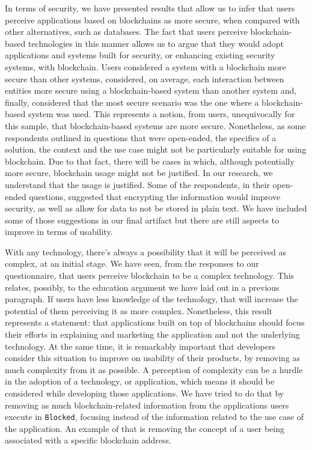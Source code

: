 In terms of security, we have presented results that allow us to infer that users perceive applications based on blockchains as more secure, when compared with other alternatives, such as databases. The fact that users perceive blockchain-based technologies in this manner allows us to argue that they would adopt applications and systems built for security, or enhancing existing security systems, with blockchain. Users considered a system with a blockchain more secure than other systems, considered, on average, each interaction between entities more secure using a blockchain-based system than another system and, finally, considered that the most secure scenario was the one where a blockchain-based system was used. This represents a notion, from users, unequivocally for this sample, that blockchain-based systems are more secure. Nonetheless, as some respondents outlined in questions that were open-ended, the specifics of a solution, the context and the use case might not be particularly suitable for using blockchain. Due to that fact, there will be cases in which, although potentially more secure, blockchain usage might not be justified. In our research, we understand that the usage is justified. Some of the respondents, in their open-ended questions, suggested that encrypting the information would improve security, as well as allow for data to not be stored in plain text. We have included some of those suggestions in our final artifact but there are still aspects to improve in terms of usability.

With any technology, there's always a possibility that it will be perceived as complex, at an initial stage. We have seen, from the responses to our questionnaire, that users perceive blockchain to be a complex technology. This relates, possibly, to the education argument we have laid out in a previous paragraph. If users have less knowledge of the technology, that will increase the potential of them perceiving it as more complex. Nonetheless, this result represents a statement: that applications built on top of blockchains should focus their efforts in explaining and marketing the application and not the underlying technology. At the same time, it is remarkably important that developers consider this situation to improve on usability of their products, by removing as much complexity from it as possible. A perception of complexity can be a hurdle in the adoption of a technology, or application, which means it should be considered while developing those applications. We have tried to do that by removing as much blockchain-related information from the applications users execute in \texttt{Blocked}, focusing instead of the information related to the use case of the application. An example of that is removing the concept of a user being associated with a specific blockchain address.

